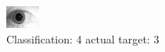 \begin{figure}[h!]
\begin{center}
\includegraphics[width=0.60\columnwidth]{figures/ID1980_class_4_target_3.png}
\end{center}
\caption{ Classification: 4 actual target: 3}
\label{fig:ID1980_class_4_target_3}
\end{figure}

